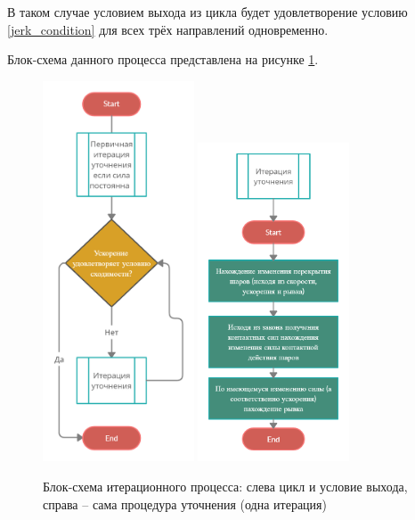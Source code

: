 \documentclass[utf8x, 14pt, oneside, a4paper]{article}
\begin{document}
В таком случае условием выхода из цикла будет удовлетворение условию \ref{jerk_condition} для всех трёх направлений одновременно.

Блок-схема данного процесса представлена на рисунке \ref{pic:iter}.

\begin{figure}[H]
	\centering
	\includegraphics[width=0.4\textwidth]{iter_cicle} 
	\includegraphics[width=0.4\textwidth]{iter_one}
	\caption{Блок-схема итерационного процесса: слева цикл и условие выхода, справа -- сама процедура уточнения (одна итерация)}
	\label{pic:iter}
\end{figure} 
\end{document}
